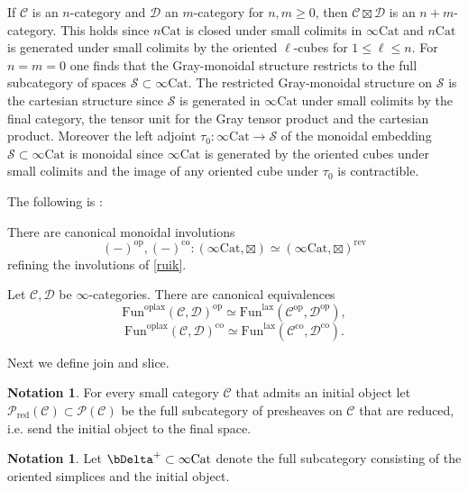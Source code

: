 \documentclass[10pt,oneside]{article}
\numberwithin{equation}{section} %
\numberwithin{figure}{section} %
\theoremstyle{plain}
\theoremstyle{definition}
\newtheorem{notation}[thm]{Notation}
\newcommand{\mC}{{\mathcal C}}
\newcommand{\mD}{{\mathcal D}}
\newcommand{\mP}{{\mathcal P}}
\newcommand{\mS}{{\mathcal S}}
\newcommand{\m}{{m}}
\newcommand{\n}{{n}}
\newcommand{\op}{\mathrm{op}}
\newcommand{\rev}{{\mathrm{rev}}}
\newcommand{\co}{\mathrm{co}}
\newcommand{\Cat}{\mathrm{Cat}}
\newcommand{\Fun}{\mathrm{Fun}}
\newcommand{\lax}{{\mathrm{lax}}}
\newcommand{\oplax}{{\mathrm{oplax}}}
\begin{document}
\begin{remark}\label{lao}\label{grayspace}
If $\mC$ is an $\n$-category and $\mD$ an $\m$-category for $\n,\m \geq 0$,
then $\mC \boxtimes \mD$ is an $\n+\m$-category.
This holds since $\n\Cat$ is closed under small colimits in $\infty\Cat$ and $\n\Cat$ is generated under small colimits by the oriented $\ell$-cubes for $1 \leq \ell \leq \n$.
For $n=m=0$ one finds that the Gray-monoidal structure restricts to the 
full subcategory of spaces $\mS \subset \infty\Cat$.
The restricted Gray-monoidal structure on $\mS$ is the cartesian structure since $\mS$ is generated in $\infty\Cat$ under small colimits by the final category, the tensor unit for the Gray tensor product and the cartesian product.
Moreover the left adjoint $\tau_0: \infty\Cat \to \mS$ of the monoidal embedding $\mS \subset \infty\Cat$ is monoidal since
$\infty\Cat$ is generated by the oriented cubes under small colimits and the image of any oriented cube under $\tau_0$ is contractible.

\end{remark}

The following is \cite[Proposition 3.4.8]{GepnerHeine2026}: 
\begin{proposition}\label{dua}
	
There are canonical monoidal involutions
$$(-)^\op, (-)^\co: (\infty\Cat, \boxtimes) \simeq (\infty\Cat, \boxtimes)^\rev $$
refining the involutions of \cref{ruik}.
\end{proposition}

\begin{corollary}\label{grayhoms}
Let $\mC,\mD $ be $\infty$-categories.
There are canonical equivalences $$ \Fun^\oplax(\mC,\mD)^\op \simeq \Fun^\lax(\mC^\op,\mD^\op), $$$$\Fun^\oplax(\mC,\mD)^\co \simeq \Fun^\lax(\mC^\co,\mD^\co).$$	
\end{corollary}

Next we define join and slice.

\begin{notation} For every small category $\mC$ that admits an initial object let $ \mP_{\mathrm{red}}(\mC) \subset \mP(\mC) $  
be the full subcategory of presheaves on $\mC$
that are reduced, i.e. send the initial object to the final space.
\end{notation}


\begin{notation}

Let $\bDelta^+\subset\infty\Cat$ denote the full subcategory consisting of the oriented simplices and the initial object. 

\end{notation}
\end{document}

